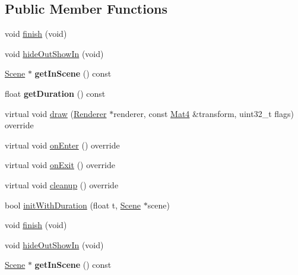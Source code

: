 \subsection*{Public Member Functions}
\begin{DoxyCompactItemize}
\item 
void \hyperlink{classTransitionScene_ae1ce8fa1d0dc4462982ec155d1c6574b}{finish} (void)
\item 
void \hyperlink{classTransitionScene_a0bed877005034028e96c266d996c924d}{hide\+Out\+Show\+In} (void)
\item 
\mbox{\label{classTransitionScene_a67aa76aac7466cde6f6aa2e27042dbf3}} 
\hyperlink{classScene}{Scene} $\ast$ {\bfseries get\+In\+Scene} () const
\item 
\mbox{\label{classTransitionScene_adcd57afab4ffae8b38e295b410c7cfb8}} 
float {\bfseries get\+Duration} () const
\item 
virtual void \hyperlink{classTransitionScene_ae3600e652909eeae3113bc39ce8ef8d1}{draw} (\hyperlink{classRenderer}{Renderer} $\ast$renderer, const \hyperlink{classMat4}{Mat4} \&transform, uint32\+\_\+t flags) override
\item 
virtual void \hyperlink{classTransitionScene_aace390a1bd8f3c73bb650a1e256a0f83}{on\+Enter} () override
\item 
virtual void \hyperlink{classTransitionScene_a45e39b658189c79428a05c3bc3173bbb}{on\+Exit} () override
\item 
virtual void \hyperlink{classTransitionScene_a1295b348d0960d857f27a39ecfb52869}{cleanup} () override
\item 
bool \hyperlink{classTransitionScene_a8d74011248967a549d855d95056d5db6}{init\+With\+Duration} (float t, \hyperlink{classScene}{Scene} $\ast$scene)
\item 
void \hyperlink{classTransitionScene_ae1ce8fa1d0dc4462982ec155d1c6574b}{finish} (void)
\item 
void \hyperlink{classTransitionScene_a0bed877005034028e96c266d996c924d}{hide\+Out\+Show\+In} (void)
\item 
\mbox{\label{classTransitionScene_a67aa76aac7466cde6f6aa2e27042dbf3}} 
\hyperlink{classScene}{Scene} $\ast$ {\bfseries get\+In\+Scene} () const
\item 
\mbox{\label{classTransitionScene_adcd57afab4ffae8b38e295b410c7cfb8}} 

\end{DoxyCompactItemize}
